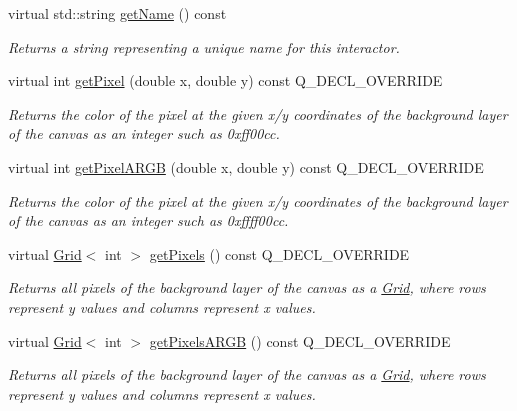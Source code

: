 \begin{DoxyCompactItemize}
virtual std\+::string \mbox{\hyperlink{classGInteractor_a8a60438a5b55d0b2ceb35c8674b9d8c5}{get\+Name}} () const
\begin{DoxyCompactList}\small\item\em Returns a string representing a unique name for this interactor. \end{DoxyCompactList}\item 
virtual int \mbox{\hyperlink{classGCanvas_a076754305680c65782a00ddd3c77b50b}{get\+Pixel}} (double x, double y) const Q\+\_\+\+D\+E\+C\+L\+\_\+\+O\+V\+E\+R\+R\+I\+DE
\begin{DoxyCompactList}\small\item\em Returns the color of the pixel at the given x/y coordinates of the background layer of the canvas as an integer such as 0xff00cc. \end{DoxyCompactList}\item 
virtual int \mbox{\hyperlink{classGCanvas_ac1016456426446714a53d29da622f2ec}{get\+Pixel\+A\+R\+GB}} (double x, double y) const Q\+\_\+\+D\+E\+C\+L\+\_\+\+O\+V\+E\+R\+R\+I\+DE
\begin{DoxyCompactList}\small\item\em Returns the color of the pixel at the given x/y coordinates of the background layer of the canvas as an integer such as 0xffff00cc. \end{DoxyCompactList}\item 
virtual \mbox{\hyperlink{classGrid}{Grid}}$<$ int $>$ \mbox{\hyperlink{classGCanvas_a430b4965720f3b35f10062a252883e75}{get\+Pixels}} () const Q\+\_\+\+D\+E\+C\+L\+\_\+\+O\+V\+E\+R\+R\+I\+DE
\begin{DoxyCompactList}\small\item\em Returns all pixels of the background layer of the canvas as a \mbox{\hyperlink{classGrid}{Grid}}, where rows represent y values and columns represent x values. \end{DoxyCompactList}\item 
virtual \mbox{\hyperlink{classGrid}{Grid}}$<$ int $>$ \mbox{\hyperlink{classGCanvas_aca5a19f5f53c5cd29b832a769fde4f68}{get\+Pixels\+A\+R\+GB}} () const Q\+\_\+\+D\+E\+C\+L\+\_\+\+O\+V\+E\+R\+R\+I\+DE
\begin{DoxyCompactList}\small\item\em Returns all pixels of the background layer of the canvas as a \mbox{\hyperlink{classGrid}{Grid}}, where rows represent y values and columns represent x values. \end{DoxyCompactList}\item 

\end{DoxyCompactItemize}
